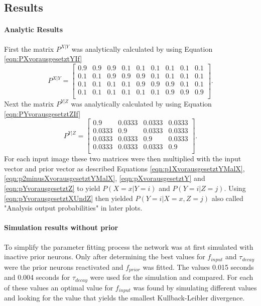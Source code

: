 \subsection{Results}

\paragraph{Analytic Results}

First the matrix $P^{X|Y}$ was analytically calculated by using Equation \ref{eqn:PXvorausgesetztYIf} 
\begin{equation}
\label{eqn:pXvorausgesetztYResult}
P^{X|Y} = \begin{bmatrix}
0.9 & 0.9 & 0.9 & 0.1 & 0.1 & 0.1 & 0.1 & 0.1 & 0.1\\
0.1 & 0.1 & 0.9 & 0.9 & 0.9 & 0.1 & 0.1 & 0.1 & 0.1\\
0.1 & 0.1 & 0.1 & 0.1 & 0.9 & 0.9 & 0.9 & 0.1 & 0.1\\
0.1 & 0.1 & 0.1 & 0.1 & 0.1 & 0.1 & 0.9 & 0.9 & 0.9\\
\end{bmatrix}.
\end{equation}
Next the matrix $P^{Y|Z}$ was analytically calculated by using Equation \ref{eqn:PYvorausgesetztZIf} 
\begin{equation}
\label{eqn:pYvorausgesetztZResult}
P^{Y|Z} = \begin{bmatrix}
0.9 & 0.0333 & 0.0333 & 0.0333\\
0.0333 & 0.9 & 0.0333 & 0.0333\\
0.0333 & 0.0333 & 0.9 & 0.0333\\
0.0333 & 0.0333 & 0.0333 & 0.9\\
\end{bmatrix}.
\end{equation} 
For each input image these two matrices were then  multiplied with the input vector and prior vector as described Equations \ref{eqn:p1XvorausgesetztYMalX}, \ref{eqn:p2minusXvorausgesetztYMalX},  \ref{eqn:pXvorausgesetztY} and \ref{eqn:pYvorausgesetztZ} to yield $P(X = x|Y = i)$ and $P(Y=i|Z=j)$. Using  \ref{eqn:pYvorausgesetztXUndZ} then 
yielded $P(Y = i|X = x, Z = j)$ also called "Analysis output probabilities" in later plots.

\paragraph{Simulation results without prior}
To simplify the parameter fitting process the network was at first simulated with inactive prior neurons. Only after determining the best values for $f_{input}$ and $\tau_{decay}$ were the prior neurons reactivated and $f_{prior}$ was fitted. The values 0.015 seconds and 0.004 seconds for $\tau_{decay}$ were used for the simulation and compared. For each of these values an optimal value for $f_{input}$ was found by simulating different values and looking for the value that yields the smallest Kullback-Leibler divergence.

